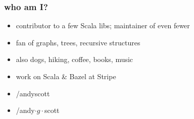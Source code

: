 \documentclass[include/preamble.tex]{subfiles}
\begin{document}
{
  \begin{frame}
    \frametitle{who am I?}
    \begin{itemize}
      \pause
    \item contributor to a few Scala libs; maintainer of even fewer
    \item fan of graphs, trees, recursive structures
    \item also dogs, hiking, coffee, books, music
    \item work on Scala \& Bazel at Stripe
      \newline
      \pause
    \item {} /andyscott
    \item {} /andy$\cdot{g}\cdot$scott
    \end{itemize}
  \end{frame}
}
\end{document}
